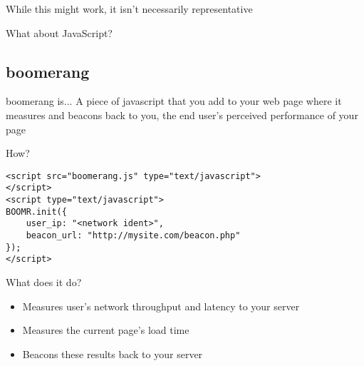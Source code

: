 \documentclass{beamer}
\begin{document}
\begin{frame}{}
  \begin{center}
  While this might work, it isn't necessarily representative
  \end{center}
\end{frame}

\begin{frame}{}
  \begin{center}
  What about JavaScript?
  \end{center}
\end{frame}

\subsection{boomerang}


\begin{frame}{}
\end{frame}

\begin{frame}
  \begin{block}{boomerang is...}
A piece of javascript that you add to your web page where it measures and beacons back to you, the end user's perceived performance of your page
  \end{block}
\end{frame}

\begin{frame}[fragile]{How?}
  \begin{verbatim}
<script src="boomerang.js" type="text/javascript">
</script>
<script type="text/javascript">
BOOMR.init({
    user_ip: "<network ident>",
    beacon_url: "http://mysite.com/beacon.php"
});
</script>
  \end{verbatim}
\end{frame}

\begin{frame}{What does it do?}
  \begin{itemize}
  \item Measures user's network throughput and latency to your server
  \item Measures the current page's load time
  \item Beacons these results back to your server
  \end{itemize}
\end{frame}
\end{document}
